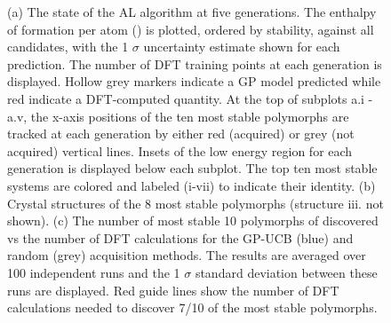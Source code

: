 \begin{figure}[!htb]
\centering
{}
\caption{\label{fig:iro3_al}
%
(a) The state of the AL algorithm at five generations.
%
The enthalpy of formation per atom (\DHf) is plotted, ordered by stability, against all \IrOthree candidates, with the 1 $\sigma$ uncertainty estimate shown for each prediction.
%
The number of DFT training points at each generation is displayed.
%
Hollow grey markers indicate a GP model predicted \DHf while red indicate a DFT-computed quantity.
%
At the top of subplots a.i - a.v, the x-axis positions of the ten most stable polymorphs are tracked at each generation by either red (acquired) or grey (not acquired) vertical lines.
%
Insets of the low energy region for each generation is displayed below each subplot.
%
The top ten most stable systems are colored and labeled (i-vii) to indicate their identity.
%
(b) Crystal structures of the \num{8} most stable \IrOthree polymorphs (structure iii. not shown).
%
%
(c) The number of most stable \num{10} polymorphs of \IrOthree discovered vs the number of DFT calculations for the GP-UCB (blue) and random (grey) acquisition methods.
%
The results are averaged over \num{100} independent runs and the 1 $\sigma$ standard deviation between these runs are displayed.
%
Red guide lines show the number of DFT calculations needed to discover \num{7/10} of the most stable polymorphs.
}
\end{figure}


